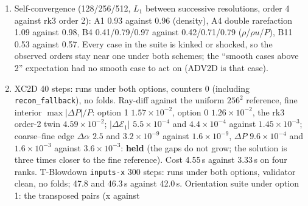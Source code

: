\documentclass[11pt,a4paper]{article}
\newcommand{\code}[1]{\texttt{\small #1}}
\begin{document}
\begin{enumerate}[nosep]
      the frozen B4 run at 64 cells: the fan ($x<0.2$) and the contact are
      as good or better, the whole increase is the weak vapour shock at
      $x\approx0.71$ (4\,\% pressure jump), which WENO5 spreads over eight
      cells (velocity 8.7 against 9.0 three cells behind it, 2.7 against 0
      one cell ahead) where the TVD correction holds three; at 256 cells
      the order-4 run is below the control on every metric ($u$ 0.0692
      against 0.0708, $P$ 0.0188 against 0.0236).  PPM at 64 cells gives
      the same 0.155.  Recorded as the weak-shock bound of
      \S\ref{sec:bounds}; a shock-aware weight (WENO-Z with the higher
      power, or a sensor that drops to the TVD face at a weak jump) is
      the follow-up if the weak-shock width matters in production.
      Option 0 differs from option 1 only on the cases with a material
      contact: B5 better (0.140 against 0.159), B7 better, B9 $u$ 0.750
      against 0.788, B11 $\rho$ 0.079 against 0.121, B2 worse (0.78
      against 0.82 in $u$ but 0.085 against 0.074 in $\rho$); gate B9
      0.708.
\item Self-convergence (128/256/512, $L_1$ between successive
      resolutions, order 4 against rk3 order 2): A1 0.93 against 0.96
      (density), A4 double rarefaction 1.09 against 0.98, B4 0.41/0.79/0.97
      against 0.42/0.71/0.79 ($\rho$/$\rho u$/$P$), B11 0.53 against 0.57.
      Every case in the suite is kinked or shocked, so the observed orders
      stay near one under both schemes; the ``smooth cases above 2''
      expectation had no smooth case to act on (ADV2D is that case).
\item XC2D 40 steps: runs under both options, counters 0 (including
      \code{recon\_fallback}), no folds.  Ray-diff against the uniform
      $256^2$ reference, fine interior $\max|\Delta P|/P$: option 1
      $1.57\times10^{-2}$, option 0 $1.26\times10^{-2}$, the rk3 order-2
      twin $4.59\times10^{-2}$; $|\Delta\mathcal{E}_1|$ $5.5\times10^{-4}$
      and $4.4\times10^{-4}$ against $1.45\times10^{-3}$; coarse--fine
      edge $\Delta\alpha$ $2.5$ and $3.2\times10^{-9}$ against
      $1.6\times10^{-9}$, $\Delta P$ $9.6\times10^{-4}$ and
      $1.6\times10^{-3}$ against $3.6\times10^{-3}$: \textbf{held} (the gaps
      do not grow; the solution is three times closer to the fine
      reference).  Cost 4.55\,s against 3.33\,s on four ranks.
      T-Blowdown \code{inputs-x} 300 steps: runs under both options,
      validator clean, no folds; 47.8 and 46.3\,s against 42.0\,s.
      Orientation suite under option 1: the transposed pairs (x against

\end{enumerate}
\end{document}
